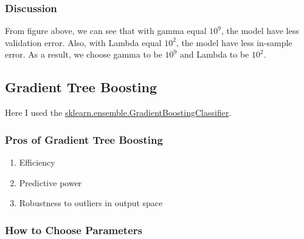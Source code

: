 \documentclass[12pt]{article}
\begin{document}
\subsubsection{Discussion}

From figure above, we can see that with gamma equal ${10}^9$, the model have less validation error. Also, with Lambda equal ${10}^2$, the model have less in-sample error. As a result, we choose gamma to be ${10}^9$ and Lambda to be ${10}^2$.

\subsection{Gradient Tree Boosting}

Here I used the \url{sklearn.ensemble.GradientBoostingClassifier}.

\subsubsection{Pros of Gradient Tree Boosting}

\begin{enumerate}
	\item Efficiency
	\item Predictive power
	\item Robustness to outliers in output space
\end{enumerate}

\subsubsection{How to Choose Parameters}
\end{document}
